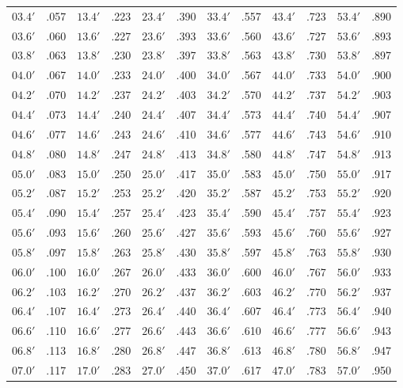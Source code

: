 \begin{table}[!h]
{\begin{tabular}{ll|ll|ll|ll|ll|ll}
$03.4'$ & .057 & $13.4'$ & .223 & $23.4'$ & .390 & $33.4'$ & .557 & $43.4'$ & .723 & $53.4'$ & .890\\
$03.6'$ & .060 & $13.6'$ & .227 & $23.6'$ & .393 & $33.6'$ & .560 & $43.6'$ & .727 & $53.6'$ & .893\\
$03.8'$ & .063 & $13.8'$ & .230 & $23.8'$ & .397 & $33.8'$ & .563 & $43.8'$ & .730 & $53.8'$ & .897\\
$04.0'$ & .067 & $14.0'$ & .233 & $24.0'$ & .400 & $34.0'$ & .567 & $44.0'$ & .733 & $54.0'$ & .900\\
$04.2'$ & .070 & $14.2'$ & .237 & $24.2'$ & .403 & $34.2'$ & .570 & $44.2'$ & .737 & $54.2'$ & .903\\
$04.4'$ & .073 & $14.4'$ & .240 & $24.4'$ & .407 & $34.4'$ & .573 & $44.4'$ & .740 & $54.4'$ & .907\\
$04.6'$ & .077 & $14.6'$ & .243 & $24.6'$ & .410 & $34.6'$ & .577 & $44.6'$ & .743 & $54.6'$ & .910\\
$04.8'$ & .080 & $14.8'$ & .247 & $24.8'$ & .413 & $34.8'$ & .580 & $44.8'$ & .747 & $54.8'$ & .913\\
$05.0'$ & .083 & $15.0'$ & .250 & $25.0'$ & .417 & $35.0'$ & .583 & $45.0'$ & .750 & $55.0'$ & .917\\
$05.2'$ & .087 & $15.2'$ & .253 & $25.2'$ & .420 & $35.2'$ & .587 & $45.2'$ & .753 & $55.2'$ & .920\\
$05.4'$ & .090 & $15.4'$ & .257 & $25.4'$ & .423 & $35.4'$ & .590 & $45.4'$ & .757 & $55.4'$ & .923\\
$05.6'$ & .093 & $15.6'$ & .260 & $25.6'$ & .427 & $35.6'$ & .593 & $45.6'$ & .760 & $55.6'$ & .927\\
$05.8'$ & .097 & $15.8'$ & .263 & $25.8'$ & .430 & $35.8'$ & .597 & $45.8'$ & .763 & $55.8'$ & .930\\
$06.0'$ & .100 & $16.0'$ & .267 & $26.0'$ & .433 & $36.0'$ & .600 & $46.0'$ & .767 & $56.0'$ & .933\\
$06.2'$ & .103 & $16.2'$ & .270 & $26.2'$ & .437 & $36.2'$ & .603 & $46.2'$ & .770 & $56.2'$ & .937\\
$06.4'$ & .107 & $16.4'$ & .273 & $26.4'$ & .440 & $36.4'$ & .607 & $46.4'$ & .773 & $56.4'$ & .940\\
$06.6'$ & .110 & $16.6'$ & .277 & $26.6'$ & .443 & $36.6'$ & .610 & $46.6'$ & .777 & $56.6'$ & .943\\
$06.8'$ & .113 & $16.8'$ & .280 & $26.8'$ & .447 & $36.8'$ & .613 & $46.8'$ & .780 & $56.8'$ & .947\\
$07.0'$ & .117 & $17.0'$ & .283 & $27.0'$ & .450 & $37.0'$ & .617 & $47.0'$ & .783 & $57.0'$ & .950\\

\end{tabular}}
\end{table}
